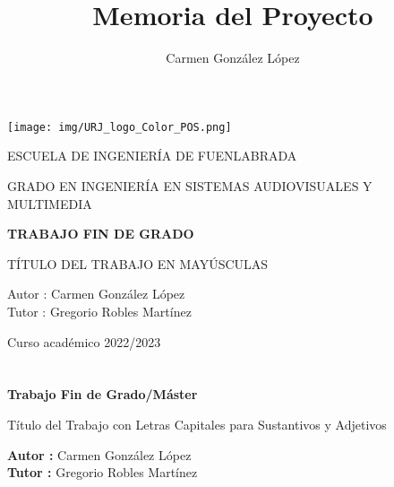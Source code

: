 \documentclass[a4paper, 12pt]{book}
\title{Memoria del Proyecto}
\author{Carmen González López}
\begin{document}
\renewcommand{\refname}{Bibliografía}  %
\renewcommand{\appendixname}{Apéndice}


\begin{titlepage}
\begin{center}
\texttt{[image: img/URJ\_logo\_Color\_POS.png]}

\vspace{1.75cm}

\LARGE
ESCUELA DE INGENIERÍA DE FUENLABRADA
\vspace{1cm}

\LARGE
GRADO EN INGENIERÍA EN SISTEMAS AUDIOVISUALES Y MULTIMEDIA

\vspace{1cm}
\LARGE
\textbf{TRABAJO FIN DE GRADO}

\vspace{2cm}

\Large
TÍTULO DEL TRABAJO EN MAYÚSCULAS

\vspace{2cm}

\large
Autor : Carmen González López \\
Tutor : Gregorio Robles Martínez\\
\vspace{1cm}

\large
Curso académico 2022/2023

\end{center}
\end{titlepage}

\newpage
\mbox{}
\thispagestyle{empty} %


\clearpage
{}
\chapter*{}

\vspace{-4cm}
\begin{center}
\LARGE
\textbf{Trabajo Fin de Grado/Máster}

\vspace{1cm}
\large
Título del Trabajo con Letras Capitales para Sustantivos y Adjetivos

\vspace{1cm}
\large
\textbf{Autor :} Carmen González López\\
\textbf{Tutor :} Gregorio Robles Martínez

\end{center}
\end{document}
